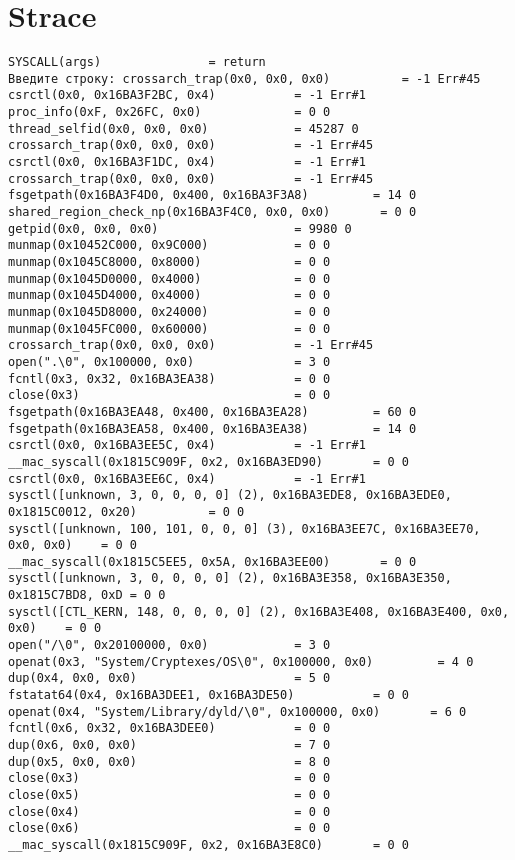 \section{Strace}
\begin{lstlisting}
SYSCALL(args)               = return
Введите строку: crossarch_trap(0x0, 0x0, 0x0)          = -1 Err#45
csrctl(0x0, 0x16BA3F2BC, 0x4)           = -1 Err#1
proc_info(0xF, 0x26FC, 0x0)             = 0 0
thread_selfid(0x0, 0x0, 0x0)            = 45287 0
crossarch_trap(0x0, 0x0, 0x0)           = -1 Err#45
csrctl(0x0, 0x16BA3F1DC, 0x4)           = -1 Err#1
crossarch_trap(0x0, 0x0, 0x0)           = -1 Err#45
fsgetpath(0x16BA3F4D0, 0x400, 0x16BA3F3A8)         = 14 0
shared_region_check_np(0x16BA3F4C0, 0x0, 0x0)       = 0 0
getpid(0x0, 0x0, 0x0)                   = 9980 0
munmap(0x10452C000, 0x9C000)            = 0 0
munmap(0x1045C8000, 0x8000)             = 0 0
munmap(0x1045D0000, 0x4000)             = 0 0
munmap(0x1045D4000, 0x4000)             = 0 0
munmap(0x1045D8000, 0x24000)            = 0 0
munmap(0x1045FC000, 0x60000)            = 0 0
crossarch_trap(0x0, 0x0, 0x0)           = -1 Err#45
open(".\0", 0x100000, 0x0)              = 3 0
fcntl(0x3, 0x32, 0x16BA3EA38)           = 0 0
close(0x3)                              = 0 0
fsgetpath(0x16BA3EA48, 0x400, 0x16BA3EA28)         = 60 0
fsgetpath(0x16BA3EA58, 0x400, 0x16BA3EA38)         = 14 0
csrctl(0x0, 0x16BA3EE5C, 0x4)           = -1 Err#1
__mac_syscall(0x1815C909F, 0x2, 0x16BA3ED90)       = 0 0
csrctl(0x0, 0x16BA3EE6C, 0x4)           = -1 Err#1
sysctl([unknown, 3, 0, 0, 0, 0] (2), 0x16BA3EDE8, 0x16BA3EDE0, 0x1815C0012, 0x20)          = 0 0
sysctl([unknown, 100, 101, 0, 0, 0] (3), 0x16BA3EE7C, 0x16BA3EE70, 0x0, 0x0)    = 0 0
__mac_syscall(0x1815C5EE5, 0x5A, 0x16BA3EE00)       = 0 0
sysctl([unknown, 3, 0, 0, 0, 0] (2), 0x16BA3E358, 0x16BA3E350, 0x1815C7BD8, 0xD = 0 0
sysctl([CTL_KERN, 148, 0, 0, 0, 0] (2), 0x16BA3E408, 0x16BA3E400, 0x0, 0x0)    = 0 0
open("/\0", 0x20100000, 0x0)            = 3 0
openat(0x3, "System/Cryptexes/OS\0", 0x100000, 0x0)         = 4 0
dup(0x4, 0x0, 0x0)                      = 5 0
fstatat64(0x4, 0x16BA3DEE1, 0x16BA3DE50)           = 0 0
openat(0x4, "System/Library/dyld/\0", 0x100000, 0x0)       = 6 0
fcntl(0x6, 0x32, 0x16BA3DEE0)           = 0 0
dup(0x6, 0x0, 0x0)                      = 7 0
dup(0x5, 0x0, 0x0)                      = 8 0
close(0x3)                              = 0 0
close(0x5)                              = 0 0
close(0x4)                              = 0 0
close(0x6)                              = 0 0
__mac_syscall(0x1815C909F, 0x2, 0x16BA3E8C0)       = 0 0

\end{lstlisting}
